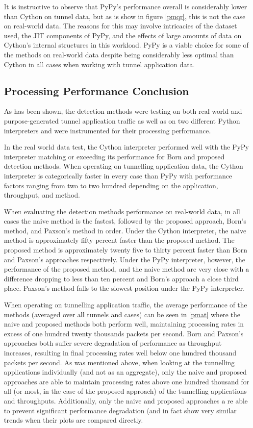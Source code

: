\documentclass[12pt]{report}
\theoremstyle{remark}
\theoremstyle{definition}
\theoremstyle{definition}
\theoremstyle{definition}
\begin{document}
It is instructive to observe that PyPy's performance overall is considerably
lower than Cython on tunnel data, but as is show in figure \ref{pmqr}, this is
not the case on real-world data. The reasons for this may involve intricacies of
the dataset used, the JIT components of PyPy, and the effects of large amounts
of data on Cython's internal structures in this workload. PyPy is a viable
choice for some of the methods on real-world data despite being considerably
less optimal than Cython in all cases when working with tunnel application data.

\subsection{Processing Performance Conclusion}
As has been shown, the detection methods were testing on both real world and
purpose-generated tunnel application traffic as well as on two different Python
interpreters and were instrumented for their processing performance.

In the real world data test, the Cython interpreter performed well with the PyPy
interpreter matching or exceeding its performance for Born and proposed
detection methods. When operating on tunnelling application data, the Cython
interpreter is categorically faster in every case than PyPy with performance
factors ranging from two to two hundred depending on the application,
throughput, and method.

When evaluating the detection methods performance on real-world data, in all
cases the naive method is the fastest, followed by the proposed approach, Born's
method, and Paxson's method in order. Under the Cython interpreter, the naive
method is approximately fifty percent faster than the proposed method. The
proposed method is approximately twenty five to thirty percent faster than Born
and Paxson's approaches respectively. Under the PyPy interpreter, however, the
performance of the proposed method, and the naive method are very close with a
difference dropping to less than ten percent and Born's approach a close third
place. Paxson's method falls to the slowest position under the PyPy interpreter.

When operating on tunnelling application traffic, the average performance of the
methods (averaged over all tunnels and cases) can be seen in \ref{pmat} where
the naive and proposed methods both perform well, maintaining processing rates
in excess of one hundred twenty thousands packets per second. Born and Paxson's
approaches both suffer severe degradation of performance as throughput
increases, resulting in final processing rates well below one hundred thousand
packets per second. As was mentioned above, when looking at the tunnelling
applications individually (and not as an aggregate), only the naive and proposed
approaches are able to maintain processing rates above one hundred thousand for
all (or most, in the case of the proposed approach) of the tunnelling
applications and throughputs. Additionally, only the naive and proposed
approaches a re able to prevent significant performance degradation (and in fact
show very similar trends when their plots are compared directly.
\end{document}
